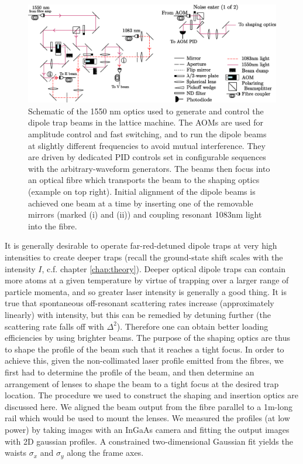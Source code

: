 	
	
	\begin{figure}
		\centering
		\includegraphics[width=\textwidth]{fig/lattice/dipole_optics}
		\caption{Schematic of the 1550 nm optics used to generate and control the dipole trap beams in the lattice machine.
		The AOMs are used for amplitude control and fast switching, and to run the dipole beams at slightly different frequencies to avoid mutual interference.
		They are driven by dedicated PID controls set in configurable sequences with the arbitrary-waveform generators.
		The beams then focus into an optical fibre which transports the beam to the shaping optics (example on top right).
		Initial alignment of the dipole beams is achieved one beam at a time by inserting one of the removable mirrors (marked (i) and (ii)) and coupling resonant 1083nm light into the fibre.}
		\label{fig:dipole_optics}
	\end{figure}
	

	It is generally desirable to operate far-red-detuned dipole traps at very high intensities to create deeper traps (recall the ground-state shift scales with the intensity $I$, c.f. chapter \ref{chap:theory}).
	Deeper optical dipole traps can contain more atoms at a given temperature by virtue of trapping over a larger range of particle momenta, and so greater laser intensity is generally a good thing.
	It is true that spontaneous off-resonant scattering rates increase (approximately linearly) with intensity, but this can be remedied by detuning further (the scattering rate falls off with $\Delta^2$).
	Therefore one can obtain better loading efficiencies by using brighter beams.
	The purpose of the shaping optics are thus to shape the profile of the beam such that it reaches a tight focus.
	In order to achieve this, given the non-collimated laser profile emitted from the fibres, we first had to determine the profile of the beam, and then determine an arrangement of lenses to shape the beam to a tight focus at the desired trap location.
	The procedure we used to construct the shaping and insertion optics are discussed here.
	We aligned the beam output from the fibre parallel to a 1m-long rail which would be used to mount the lenses.
	We measured the profiles (at low power) by taking images with an InGaAs camera and fitting the output images with 2D gaussian profiles.
	A constrained two-dimensional Gaussian fit yields the waists $\sigma_x$ and $\sigma_y$ along the frame axes.

